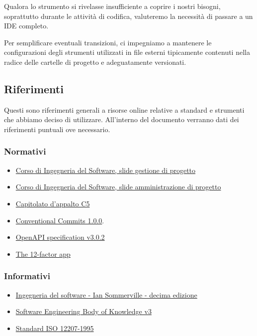 \documentclass[../norme-di-progetto.tex]{subfiles}
\begin{document}
Qualora lo strumento si rivelasse insufficiente a coprire i nostri bisogni, soprattutto durante le attività di codifica, valuteremo la necessità di passare a un IDE completo.

Per semplificare eventuali transizioni, ci impegniamo a mantenere le configurazioni degli strumenti utilizzati in file esterni tipicamente contenuti nella radice delle cartelle di progetto e adeguatamente versionati.

\subsection{Riferimenti}%
\label{sub:riferimenti}

Questi sono riferimenti generali a risorse online relative a standard e strumenti che abbiamo deciso di utilizzare.
All'interno del documento verranno dati dei riferimenti puntuali ove necessario.

\subsubsection{Normativi}%
\label{subs:riferimenti/normativi}

\begin{itemize}
  \item \href{https://www.math.unipd.it/~tullio/IS-1/2019/Dispense/L06.pdf}{Corso di Ingegneria del Software, slide gestione di progetto}
  \item \href{https://www.math.unipd.it/~tullio/IS-1/2019/Dispense/FC01.pdf}{Corso di Ingegneria del Software, slide amministrazione di progetto}
  \item \href{https://www.math.unipd.it/~tullio/IS-1/2019/Progetto/C5.pdf}{Capitolato d'appalto C5}
  \item \href{https://www.conventionalcommits.org/en/v1.0.0/}{Conventional Commits 1.0.0}.
  \item \href{https://spec.openapis.org/oas/v3.0.2}{OpenAPI specification v3.0.2}
  \item \href{https://12factor.net/}{The 12-factor app}
\end{itemize}

\subsubsection{Informativi}%
\label{subs:riferimenti/informativi}

\begin{itemize}
  \item \href{https://www.pearson.it/opera/pearson/0-6424-ingegneria_del_software}{Ingegneria del software - Ian Sommerville - decima edizione}
  \item \href{https://www.computer.org/education/bodies-of-knowledge/software-engineering/v3}{Software Engineering Body of Knowledge v3}
  \item \href{https://www.math.unipd.it/~tullio/IS-1/2009/Approfondimenti/ISO_12207-1995.pdf}{Standard ISO 12207-1995}
\end{itemize}
\end{document}
